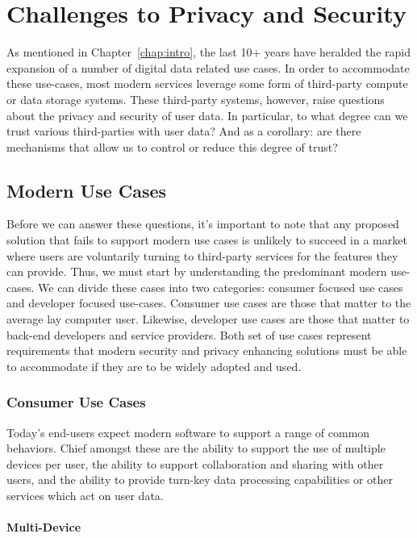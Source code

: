 \chapter{Challenges to Privacy and Security}
\label{chap:challenges}

As mentioned in Chapter~\ref{chap:intro}, the last 10+ years have
heralded the rapid expansion of a number of digital data related use
cases. In order to accommodate these use-cases, most modern services
leverage some form of third-party compute or data storage
systems. These third-party systems, however, raise questions about the
privacy and security of user data. In particular, to what degree can
we trust various third-parties with user data? And as a corollary: are
there mechanisms that allow us to control or reduce this degree of
trust?

\section{Modern Use Cases}
\label{chap:challenges:usecases}

Before we can answer these questions, it's important to note that any
proposed solution that fails to support modern use cases is unlikely
to succeed in a market where users are voluntarily turning to
third-party services for the features they can provide. Thus, we must
start by understanding the predominant modern use-cases. We can divide
these cases into two categories: consumer focused use cases and
developer focused use-cases. Consumer use cases are those that matter
to the average lay computer user. Likewise, developer use cases are
those that matter to back-end developers and service providers.  Both
set of use cases represent requirements that modern security and
privacy enhancing solutions must be able to accommodate if they are to
be widely adopted and used.

\subsection{Consumer Use Cases}

Today's end-users expect modern software to support a range of common
behaviors. Chief amongst these are the ability to support the use of
multiple devices per user, the ability to support collaboration and
sharing with other users, and the ability to provide turn-key data
processing capabilities or other services which act on user data.

\subsubsection{Multi-Device}

